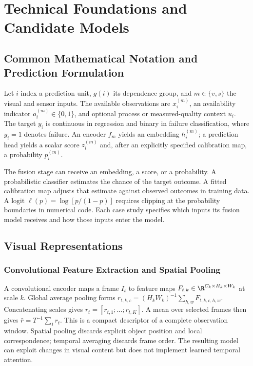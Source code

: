 \chapter{Technical Foundations and Candidate Models}
\label{ch:foundations}

\section{Common Mathematical Notation and Prediction Formulation}
Let $i$ index a prediction unit, $g(i)$ its dependence group, and $m\in\{v,s\}$ the visual and sensor inputs. The available observations are $x_i^{(m)}$, an availability indicator $a_i^{(m)}\in\{0,1\}$, and optional process or measured-quality context $u_i$. The target $y_i$ is continuous in regression and binary in failure classification, where $y_i=1$ denotes failure. An encoder $f_m$ yields an embedding $h_i^{(m)}$; a prediction head yields a scalar score $z_i^{(m)}$ and, after an explicitly specified calibration map, a probability $p_i^{(m)}$.

The fusion stage can receive an embedding, a score, or a probability. A probabilistic classifier estimates the chance of the target outcome. A fitted calibration map adjusts that estimate against observed outcomes in training data. A logit $\ell(p)=\log[p/(1-p)]$ requires clipping at the probability boundaries in numerical code. Each case study specifies which inputs its fusion model receives and how those inputs enter the model.

\section{Visual Representations}
\subsection{Convolutional Feature Extraction and Spatial Pooling}
A convolutional encoder maps a frame $I_t$ to feature maps $F_{t,k}\in\R^{C_k\times H_k\times W_k}$ at scale $k$. Global average pooling forms $r_{t,k,c}=(H_kW_k)^{-1}\sum_{h,w}F_{t,k,c,h,w}$. Concatenating scales gives $r_t=[r_{t,1};\ldots;r_{t,K}]$. A mean over selected frames then gives $\bar r=T^{-1}\sum_t r_t$. This is a compact descriptor of a complete observation window. Spatial pooling discards explicit object position and local correspondence; temporal averaging discards frame order. The resulting model can exploit changes in visual content but does not implement learned temporal attention.

